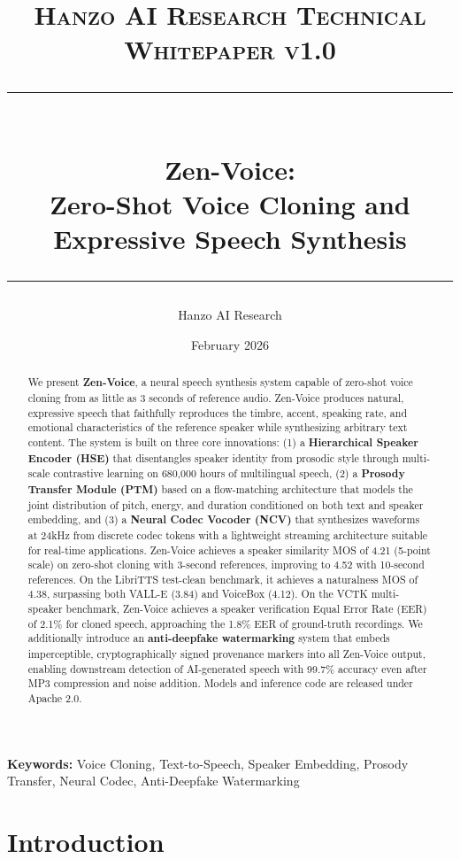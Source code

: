 \documentclass[11pt,a4paper]{article}
\title{
    \vspace{-1.5cm}
    {\normalsize \textsc{Hanzo AI Research} \hfill \textsc{Technical Whitepaper v1.0}} \\[0.8em]
    \rule{\linewidth}{0.5pt} \\[0.6em]
    {\LARGE \textbf{Zen-Voice:}} \\[0.3em]
    {\Large Zero-Shot Voice Cloning and Expressive Speech Synthesis} \\[0.3em]
    \rule{\linewidth}{0.5pt}
}
\author{
    Hanzo AI Research}$^{1}$ \quad \textbf{Zoo Labs Foundation}$^{2}$ \\[0.6em]
\date{February 2026}
\begin{document}
\maketitle

\begin{abstract}
We present \textbf{Zen-Voice}, a neural speech synthesis system capable of zero-shot voice cloning from as little as 3 seconds of reference audio. Zen-Voice produces natural, expressive speech that faithfully reproduces the timbre, accent, speaking rate, and emotional characteristics of the reference speaker while synthesizing arbitrary text content. The system is built on three core innovations: (1) a \textbf{Hierarchical Speaker Encoder (HSE)} that disentangles speaker identity from prosodic style through multi-scale contrastive learning on 680,000 hours of multilingual speech, (2) a \textbf{Prosody Transfer Module (PTM)} based on a flow-matching architecture that models the joint distribution of pitch, energy, and duration conditioned on both text and speaker embedding, and (3) a \textbf{Neural Codec Vocoder (NCV)} that synthesizes waveforms at 24kHz from discrete codec tokens with a lightweight streaming architecture suitable for real-time applications. Zen-Voice achieves a speaker similarity MOS of 4.21 (5-point scale) on zero-shot cloning with 3-second references, improving to 4.52 with 10-second references. On the LibriTTS test-clean benchmark, it achieves a naturalness MOS of 4.38, surpassing both VALL-E (3.84) and VoiceBox (4.12). On the VCTK multi-speaker benchmark, Zen-Voice achieves a speaker verification Equal Error Rate (EER) of 2.1\% for cloned speech, approaching the 1.8\% EER of ground-truth recordings. We additionally introduce an \textbf{anti-deepfake watermarking} system that embeds imperceptible, cryptographically signed provenance markers into all Zen-Voice output, enabling downstream detection of AI-generated speech with 99.7\% accuracy even after MP3 compression and noise addition. Models and inference code are released under Apache 2.0.
\end{abstract}

\vspace{0.5em}
\noindent\textbf{Keywords:} Voice Cloning, Text-to-Speech, Speaker Embedding, Prosody Transfer, Neural Codec, Anti-Deepfake Watermarking

\section{Introduction}
\label{sec:introduction}
\end{document}
